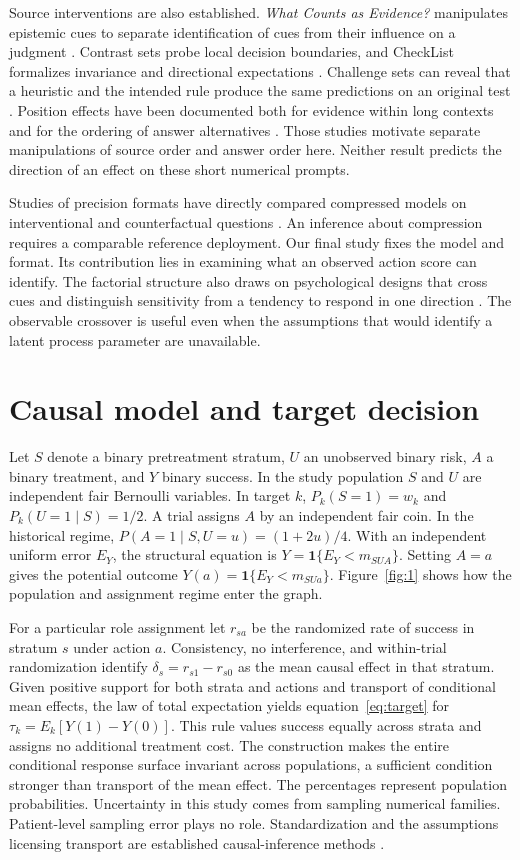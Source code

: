Source interventions are also established. \emph{What Counts as Evidence?} manipulates epistemic cues to separate identification of cues from their influence on a judgment \citep{cue}. Contrast sets probe local decision boundaries, and CheckList formalizes invariance and directional expectations \citep{contrast,checklist}. Challenge sets can reveal that a heuristic and the intended rule produce the same predictions on an original test \citep{shortcut}. Position effects have been documented both for evidence within long contexts and for the ordering of answer alternatives \citep{middle,position}. Those studies motivate separate manipulations of source order and answer order here. Neither result predicts the direction of an effect on these short numerical prompts.

Studies of precision formats have directly compared compressed models on interventional and counterfactual questions \citep{compress}. An inference about compression requires a comparable reference deployment. Our final study fixes the model and format. Its contribution lies in examining what an observed action score can identify. The factorial structure also draws on psychological designs that cross cues and distinguish sensitivity from a tendency to respond in one direction \citep{jacoby,cni,sdt}. The observable crossover is useful even when the assumptions that would identify a latent process parameter are unavailable.

\section{Causal model and target decision}
Let $S$ denote a binary pretreatment stratum, $U$ an unobserved binary risk, $A$ a binary treatment, and $Y$ binary success. In the study population $S$ and $U$ are independent fair Bernoulli variables. In target $k$, $P_k(S=1)=w_k$ and $P_k(U=1\mid S)=1/2$. A trial assigns $A$ by an independent fair coin. In the historical regime, $P(A=1\mid S,U=u)=(1+2u)/4$. With an independent uniform error $E_Y$, the structural equation is $Y=\mathbf{1}\{E_Y<m_{SUA}\}$. Setting $A=a$ gives the potential outcome $Y(a)=\mathbf{1}\{E_Y<m_{SUa}\}$. Figure~\ref{fig:1} shows how the population and assignment regime enter the graph.

For a particular role assignment let $r_{sa}$ be the randomized rate of success in stratum $s$ under action $a$. Consistency, no interference, and within-trial randomization identify $\delta_s=r_{s1}-r_{s0}$ as the mean causal effect in that stratum. Given positive support for both strata and actions and transport of conditional mean effects, the law of total expectation yields equation~\eqref{eq:target} for $\tau_k=E_k[Y(1)-Y(0)]$.
This rule values success equally across strata and assigns no additional treatment cost. The construction makes the entire conditional response surface invariant across populations, a sufficient condition stronger than transport of the mean effect. The percentages represent population probabilities. Uncertainty in this study comes from sampling numerical families. Patient-level sampling error plays no role. Standardization and the assumptions licensing transport are established causal-inference methods \citep{transport,trial}.

